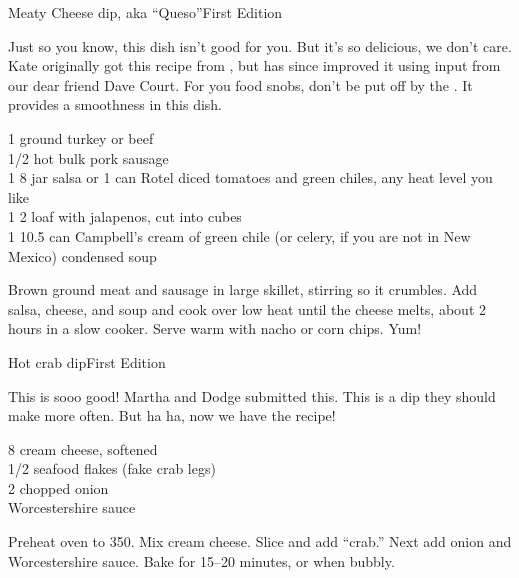 \begin{entry}{Meaty Cheese dip, aka ``Queso''}{First Edition}

\begin{open}
  Just so you know, this dish isn't good for you. But it's so delicious, we
  don't care. Kate originally got this recipe from , but
  has since improved it using input from our dear friend Dave Court.  For you food snobs, don't be put off by the .  It
  provides a smoothness in this dish.
\end{open}
\begin{ingredients}
  \SI{1}{\pound} ground turkey or beef\\
  \SI{1/2}{\pound} hot bulk pork sausage\\
  1 \SI{8}{\ounce} jar salsa or 1 can Rotel diced tomatoes and green chiles, any heat level you like\\
  1 \SI{2}{\pound} loaf  with jalapenos, cut into cubes\\
  1 \SI{10.5}{\ounce} can Campbell's cream of green chile (or celery, if you are not in New Mexico) condensed soup
\end{ingredients}
Brown ground meat and sausage in large skillet, stirring so it crumbles. Add
salsa, cheese, and soup and cook over low heat until the cheese melts, about 2
hours in a slow cooker. Serve warm with nacho or corn chips. Yum!
\end{entry}

\begin{entry}{Hot crab dip}{First Edition}

\begin{open}
  This is sooo good! Martha and Dodge submitted this. This is a dip they
  should make more often. But ha ha, now we have the recipe!
\end{open}
\begin{ingredients}
  \SI{8}{\ounce} cream cheese, softened\\
  \SI{1/2}{\pound} seafood flakes (fake crab legs)\\
  \SI{2}{\tblspoon} chopped onion\\
  Worcestershire sauce
\end{ingredients}
Preheat oven to \SI{350}{\degreeF}. Mix cream cheese. Slice and add ``crab.''
Next add onion and Worcestershire sauce. Bake for \numrange{15}{20} minutes,
or when bubbly.
\end{entry}

